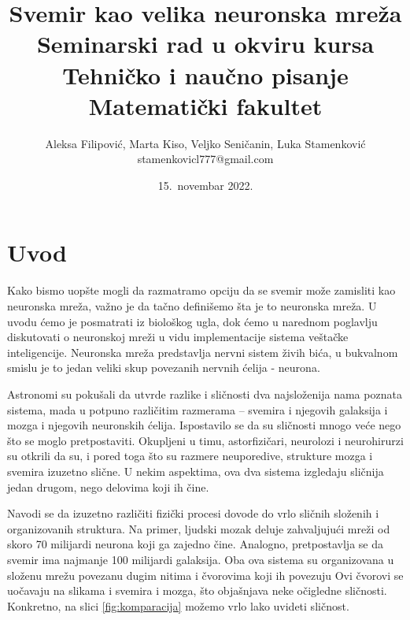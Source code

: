\documentclass[a4paper]{article}
\begin{document}
\title{Svemir kao velika neuronska mreža\\ \small{Seminarski rad u okviru kursa\\Tehničko i naučno pisanje\\ Matematički fakultet}}

\author{Aleksa Filipović, Marta Kiso, Veljko Seničanin, Luka Stamenković\\stamenkovicl777@gmail.com}
\date{15.~novembar 2022.}
\maketitle
{}
\tableofcontents

\newpage

\section{Uvod}
\label{sec:uvod}
\justifying
Kako bismo uopšte mogli da razmatramo opciju da se svemir može zamisliti kao neuronska mreža, važno je da tačno definišemo šta je to neuronska mreža. U uvodu ćemo je posmatrati iz biološkog ugla, dok ćemo u narednom poglavlju diskutovati o neuronskoj mreži u vidu implementacije sistema veštačke inteligencije. Neuronska mreža predstavlja nervni sistem živih bića, u bukvalnom smislu je to jedan veliki skup povezanih nervnih ćelija - neurona.  

Astronomi su pokušali da utvrde razlike i sličnosti dva najsloženija nama poznata sistema, mada u potpuno različitim razmerama – svemira i njegovih galaksija i mozga i njegovih neuronskih ćelija. Ispostavilo se da su sličnosti mnogo veće nego što se moglo pretpostaviti. Okupljeni u timu, astorfizičari, neurolozi i neurohirurzi su otkrili da su, i pored toga što su razmere neuporedive, strukture mozga i svemira izuzetno slične. U nekim aspektima, ova dva sistema izgledaju sličnija jedan drugom, nego delovima koji ih čine.  

Navodi se da izuzetno različiti fizički procesi dovode do vrlo sličnih složenih i organizovanih struktura. Na primer, ljudski mozak deluje zahvaljujući mreži od skoro 70 milijardi neurona koji ga zajedno čine. Analogno, pretpostavlja se da svemir ima najmanje 100 milijardi galaksija.\cite{6} Oba ova sistema su organizovana u složenu mrežu povezanu dugim nitima i čvorovima koji ih povezuju Ovi čvorovi se uočavaju na slikama i svemira i mozga, što objašnjava neke očigledne sličnosti. Konkretno, na slici \ref{fig:komparacija} možemo vrlo lako uvideti sličnost.
\end{document}
